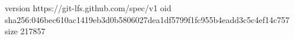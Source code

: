version https://git-lfs.github.com/spec/v1
oid sha256:046bec610ac1419eb3d0b5806027dea1df5799f1fc955b4eadd3c5c4ef14c757
size 217857
